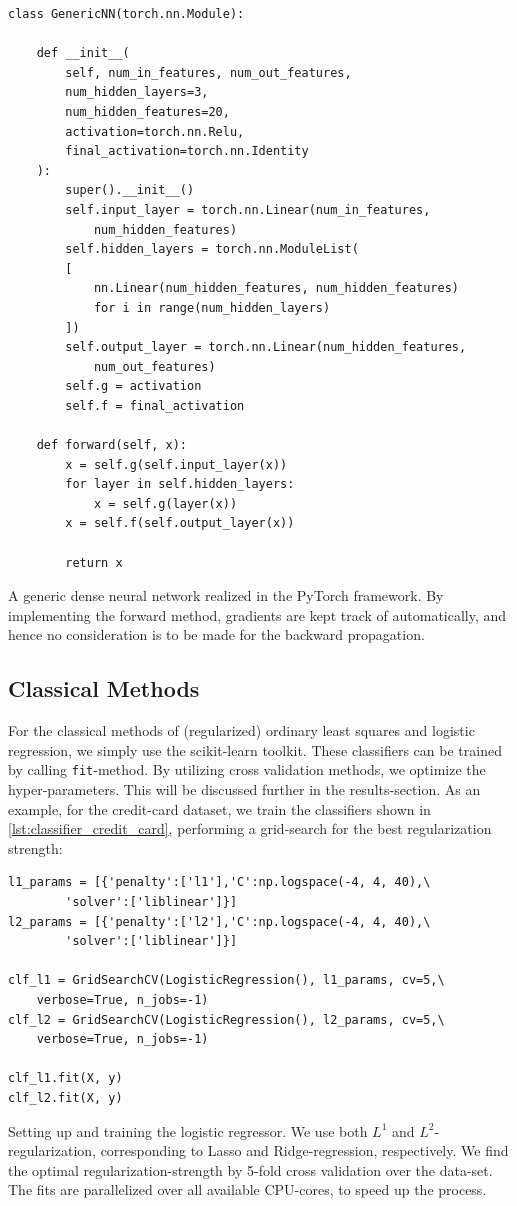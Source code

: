 \documentclass[a4paper, oneside, article]{memoir}
\begin{document}
	\begin{listing}
	\begin{verbatim}
class GenericNN(torch.nn.Module):

	def __init__(
		self, num_in_features, num_out_features,
		num_hidden_layers=3,
		num_hidden_features=20,
		activation=torch.nn.Relu,
		final_activation=torch.nn.Identity
	):	
		super().__init__()
		self.input_layer = torch.nn.Linear(num_in_features, 
			num_hidden_features)
		self.hidden_layers = torch.nn.ModuleList(
		[
			nn.Linear(num_hidden_features, num_hidden_features)
			for i in range(num_hidden_layers) 
		])
		self.output_layer = torch.nn.Linear(num_hidden_features,
			num_out_features)
		self.g = activation
		self.f = final_activation
	
	def forward(self, x):
		x = self.g(self.input_layer(x))
		for layer in self.hidden_layers:
			x = self.g(layer(x))
		x = self.f(self.output_layer(x))
		
		return x
	\end{verbatim}	
	\caption{A generic dense neural network realized in the PyTorch
	framework. By implementing the forward method, gradients are kept track
	of automatically, and hence no consideration is to be made for the backward
	propagation.}
	\label{lst:neural_network}
	\end{listing}

	\subsection{Classical Methods}

	For the classical methods of (regularized) ordinary least squares and
	logistic regression, we simply use the scikit-learn toolkit. These
	classifiers can be trained by calling \texttt{fit}-method. By utilizing
	cross validation methods, we optimize the hyper-parameters. This will
	be discussed further in the results-section. As an example, for the credit-card dataset, we
	train the classifiers shown in \cref{lst:classifier_credit_card}, performing a grid-search for the best regularization strength:
	\begin{listing}
	\begin{verbatim}
l1_params = [{'penalty':['l1'],'C':np.logspace(-4, 4, 40),\
		'solver':['liblinear']}]
l2_params = [{'penalty':['l2'],'C':np.logspace(-4, 4, 40),\
		'solver':['liblinear']}]

clf_l1 = GridSearchCV(LogisticRegression(), l1_params, cv=5,\
	verbose=True, n_jobs=-1)
clf_l2 = GridSearchCV(LogisticRegression(), l2_params, cv=5,\
	verbose=True, n_jobs=-1)

clf_l1.fit(X, y)
clf_l2.fit(X, y)
	\end{verbatim}
	\caption{Setting up and training the logistic regressor. We use both
	\(L^1\) and \( L^2\)-regularization, corresponding to Lasso and
Ridge-regression, respectively. We find the optimal regularization-strength by
5-fold cross validation over the data-set. The fits are parallelized over all
available CPU-cores, to speed up the process.}
	\label{lst:classifier_credit_card}
	\end{listing}
\end{document}
